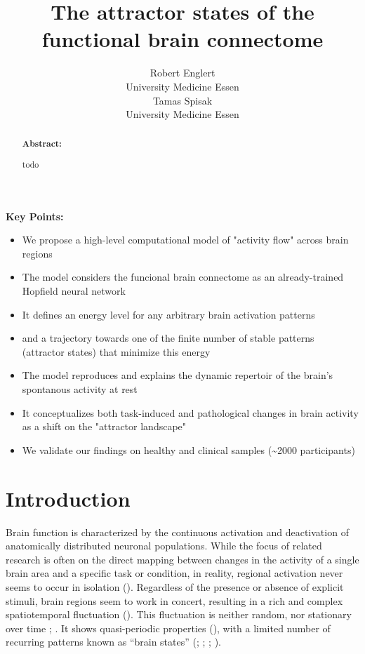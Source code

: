 \documentclass{article}
\title{The attractor states of the functional brain connectome}
\date{\displaydate{articleDate}}
\author{Robert Englert\\
University Medicine Essen\\\AND
Tamas Spisak\footnotemark[1]\\
University Medicine Essen\\}
\begin{document}
\maketitle
{}

\begin{abstract}
\textbf{Abstract:}

todo
\end{abstract}

\keywords{}

\textbf{Key Points:}

\begin{itemize}
\item We propose a high-level computational model of "activity flow" across brain regions
\item The model considers the funcional brain connectome as an already-trained Hopfield neural network
\item It defines an energy level for any arbitrary brain activation patterns
\item and a trajectory towards one of the finite number of stable patterns (attractor states) that minimize this energy
\item The model reproduces and explains the dynamic repertoir of the brain's spontanous activity at rest
\item It conceptualizes both task-induced and pathological changes in brain activity as a shift on the "attractor landscape"
\item We validate our findings on healthy and clinical samples ({\textasciitilde}2000 participants)
\end{itemize}

\section{Introduction}\label{Introduction}

Brain function is characterized by the continuous activation and deactivation of anatomically distributed neuronal populations.
While the focus of related research is often on the direct mapping between changes in the activity of a single brain area and a specific task or condition, in reality, regional activation never seems to occur in isolation (\href{https://doi.org/10.1038/nn.4502}{}).
Regardless of the presence or absence of explicit stimuli, brain regions seem to work in concert, resulting in a rich and complex spatiotemporal fluctuation (\cite{Gutierrez_Barragan_2019}).
This fluctuation is neither random, nor stationary over time \href{https://doi.org/10.1073/pnas.1216856110}{}; \cite{Zalesky_2014}. It shows quasi-periodic properties (\cite{Thompson_2014}), with a limited number of recurring patterns known as ``brain states'' (\cite{Greene_2023}; \cite{Vidaurre_2017}; \cite{Liu_2013}; \cite{Richiardi_2011}).
\end{document}
